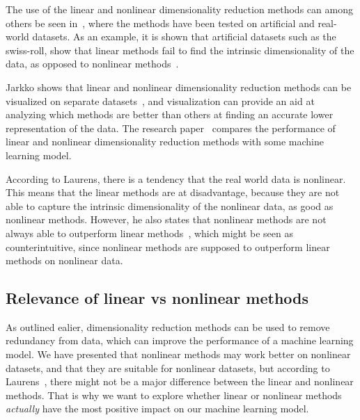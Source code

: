 The use of the linear and nonlinear dimensionality reduction methods can among others be seen in~\cite{dimensionality-reduction-comparative-review, tennenbaum}, where the methods have been tested on artificial and real-world datasets. As an example, it is shown that artificial datasets such as the swiss-roll, show that linear methods fail to find the intrinsic dimensionality of the data, as opposed to nonlinear methods~\cite{tennenbaum}.

Jarkko shows that linear and nonlinear dimensionality reduction methods can be visualized on separate datasets~\cite{dim-red-visual}, and visualization can provide an aid at analyzing which methods are better than others at finding an accurate lower representation of the data. The research paper~\cite{dimensionality-reduction-comparative-review} compares the performance of linear and nonlinear dimensionality reduction methods with some machine learning model.

According to Laurens, there is a tendency that the real world data is nonlinear. This means that the linear methods are at disadvantage, because they are not able to capture the intrinsic dimensionality of the nonlinear data, as good as nonlinear methods. However, he also states that nonlinear methods are not always able to outperform linear methods~\cite{dimensionality-reduction-comparative-review}, which might be seen as counterintuitive, since nonlinear methods are supposed to outperform linear methods on nonlinear data.


\subsection{Relevance of linear vs nonlinear methods} 

As outlined ealier, dimensionality reduction methods can be used to remove redundancy from data, which can improve the performance of a machine learning model. We have presented that nonlinear methods may work better on nonlinear datasets, and that they are suitable for nonlinear datasets, but according to Laurens~\cite{dimensionality-reduction-comparative-review}, there might not be a major difference between the linear and nonlinear methods. That is why we want to explore whether linear or nonlinear methods \textit{actually} have the most positive impact on our machine learning model.





